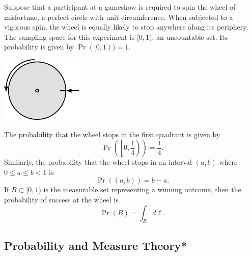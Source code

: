 \begin{example}
Suppose that a participant at a gameshow is required to spin the wheel of misfortune, a perfect circle with unit circumference.
When subjected to a vigorous spin, the wheel is equally likely to stop anywhere along its periphery.
The sampling space for this experiment is $[0, 1)$, an uncountable set.
Its probability is given by $\Pr ([0, 1)) = 1$.

\begin{center}
\includegraphics[height=3.15cm]{Figures/2Chapter/wheel}
\end{center}

The probability that the wheel stops in the first quadrant is given by
\begin{equation*}
\Pr \left( \left[ 0, \frac{1}{4} \right) \right) = \frac{1}{4}.
\end{equation*}
Similarly, the probability that the wheel stops in an interval $(a, b)$ where $0 \leq a \leq b < 1$ is
\begin{equation*}
\Pr ((a,b)) = b - a.
\end{equation*}
If $B \subset [0, 1)$ is the measurable set representing a winning outcome, then the probability of success at the wheel is
\begin{equation*}
\Pr(B) = \int_B d\ell.
\end{equation*}
\end{example}


\subsection{Probability and Measure Theory*}

